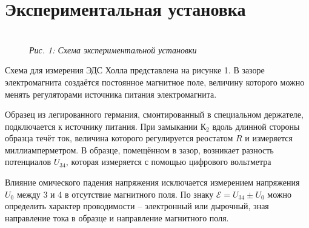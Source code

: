 

\newcommand{\formula}[3]
{
    \noindent#1\\[0.1cm]
    \begin{equation}\label{#2}
        #3
    \end{equation}
}

\newcommand{\mth}[1]
{
    \begin{math}
        #1
    \end{math}
}

\newcommand{\ruB}[1]
{
    _{\text{#1}}
}

\section{Экспериментальная установка}

\begin{figure}[h!]
    \\
    \textit{Рис. 1: Схема экспериментальной установки}
\end{figure}
Схема для измерения ЭДС Холла представлена на рисунке 1. В зазоре электромагнита создаётся постоянное магнитное поле, величину которого можно менять регуляторами источника питания электромагнита.

Образец из легированного германия, смонтированный в специальном держателе, подключается к источнику питания. При замыкании К$_2$ вдоль длинной стороны образца течёт ток, величина которого регулируется реостатом $R$ и измеряется миллиамперметром. В образце, помещённом в зазор, возникает разность потенциалов $U_{34}$, которая измеряется с помощью цифрового вольтметра

Влияние омического падения напряжения исключается измерением напряжения $U_0$ между 3 и 4 в отсутствие магнитного поля. По знаку $\mathcal{E} = U_{34} \pm U_0$ можно определить характер проводимости -- электронный или дырочный, зная направление тока в образце и направление магнитного поля.

